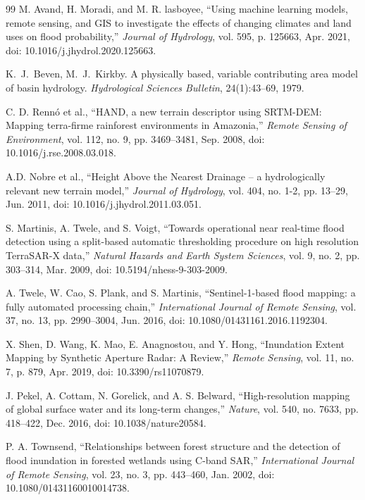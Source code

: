 \begin{thebibliography}{99}
M. Avand, H. Moradi, and M. R. lasboyee, ``Using machine learning models, remote sensing, and GIS to investigate the effects of changing climates and land uses on flood probability,'' \emph{Journal of Hydrology}, vol. 595, p. 125663, Apr. 2021, doi: 10.1016/j.jhydrol.2020.125663.

K.~J.~Beven, M.~J.~Kirkby. A physically based, variable contributing area model of basin hydrology. \emph{Hydrological Sciences Bulletin}, 24(1):43--69, 1979.

C. D. Rennó et al., ``HAND, a new terrain descriptor using SRTM-DEM: Mapping terra-firme rainforest environments in Amazonia,'' \emph{Remote Sensing of Environment}, vol. 112, no. 9, pp. 3469--3481, Sep. 2008, doi: 10.1016/j.rse.2008.03.018.

A.D. Nobre et al., ``Height Above the Nearest Drainage -- a hydrologically relevant new terrain model,'' \emph{Journal of Hydrology}, vol. 404, no. 1-2, pp. 13--29, Jun. 2011, doi: 10.1016/j.jhydrol.2011.03.051.

S. Martinis, A. Twele, and S. Voigt, ``Towards operational near real-time flood detection using a split-based automatic thresholding procedure on high resolution TerraSAR-X data,'' \emph{Natural Hazards and Earth System Sciences}, vol. 9, no. 2, pp. 303--314, Mar. 2009, doi: 10.5194/nhess-9-303-2009.

A. Twele, W. Cao, S. Plank, and S. Martinis, ``Sentinel-1-based flood mapping: a fully automated processing chain,'' \emph{International Journal of Remote Sensing}, vol. 37, no. 13, pp. 2990--3004, Jun. 2016, doi: 10.1080/01431161.2016.1192304.

X. Shen, D. Wang, K. Mao, E. Anagnostou, and Y. Hong, ``Inundation Extent Mapping by Synthetic Aperture Radar: A Review,'' \emph{Remote Sensing}, vol. 11, no. 7, p. 879, Apr. 2019, doi: 10.3390/rs11070879.

J. Pekel, A. Cottam, N. Gorelick, and A. S. Belward, ``High-resolution mapping of global surface water and its long-term changes,'' \emph{Nature}, vol. 540, no. 7633, pp. 418--422, Dec. 2016, doi: 10.1038/nature20584.

P. A. Townsend, ``Relationships between forest structure and the detection of flood inundation in forested wetlands using C-band SAR,'' \emph{International Journal of Remote Sensing}, vol. 23, no. 3, pp. 443--460, Jan. 2002, doi: 10.1080/01431160010014738.


\end{thebibliography}
